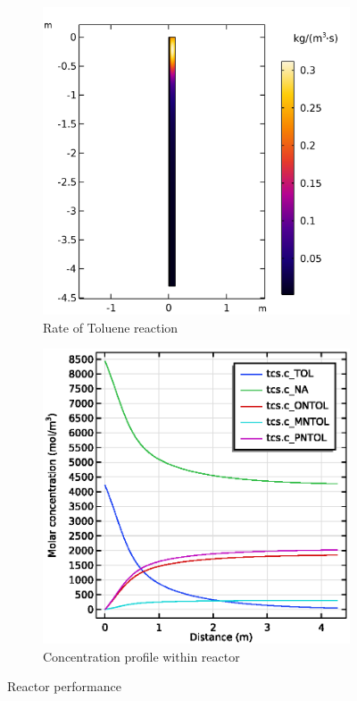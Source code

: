 \begin{figure}[h]
    \centering

    \begin{subfigure}{0.49\linewidth}
        \includegraphics[width=\linewidth, scale=0.5]{figures/r_TOL.png}
        \caption{Rate of Toluene reaction}
        \label{fig:comsol-performance:r_TOL}
    \end{subfigure}
    \begin{subfigure}{0.49\linewidth}
        \includegraphics[width=\linewidth, scale=0.5]{figures/concentration.eps}
        \caption{Concentration profile within reactor}
        \label{fig:comsol-performance:concentration}
    \end{subfigure}

    \caption{Reactor performance}
    \label{fig:comsol-performance}
\end{figure}


